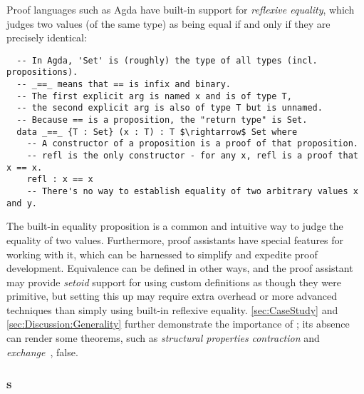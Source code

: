 Proof languages such as Agda have built-in support for \emph{reflexive equality}, which judges two values (of the same type) as being equal if and only if they are precisely identical:
\begin{lstlisting}
  -- In Agda, 'Set' is (roughly) the type of all types (incl. propositions).
  -- _==_ means that == is infix and binary.
  -- The first explicit arg is named x and is of type T,
  -- the second explicit arg is also of type T but is unnamed.
  -- Because == is a proposition, the "return type" is Set.
  data _==_ {T : Set} (x : T) : T $\rightarrow$ Set where
    -- A constructor of a proposition is a proof of that proposition.
    -- refl is the only constructor - for any x, refl is a proof that x == x.
    refl : x == x
    -- There's no way to establish equality of two arbitrary values x and y.
\end{lstlisting}

The built-in equality proposition is a common and intuitive way to judge the equality of two values.
%
Furthermore, proof assistants have special features for working with it, which can be harnessed to simplify and expedite proof development.
%
Equivalence can be defined in other ways, and the proof assistant may provide \emph{setoid} support for using custom definitions as though they were primitive,
%
but setting this up may require extra overhead or more advanced techniques than simply using built-in reflexive equality.
%
\autoref{sec:CaseStudy} and \autoref{sec:Discussion:Generality} further demonstrate the importance of \Extensional{}; its absence can render some theorems, such as \emph{structural properties} \emph{contraction} and \emph{exchange}~\citep{StructProp}, false.


\subsubsection{\Cal{}s}

